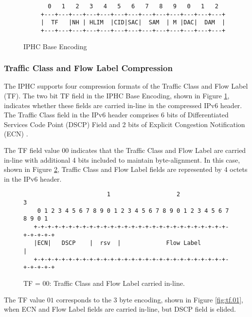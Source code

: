 \documentclass[12pt, titlepage, a4paper]{report}
\newenvironment{mylisting}
{\begin{list}{}{\setlength{\leftmargin}{1em}}\item\footnotesize}
{\end{list}}
\begin{document}
\begin{figure}[htp]
\begin{mylisting}
\begin{verbatim}
       0   1   2   3   4   5   6   7   8   9   0   1   2  
     +---+---+---+---+---+---+---+---+---+---+---+---+---+
     |  TF   |NH | HLIM  |CID|SAC|  SAM  | M |DAC|  DAM  |
     +---+---+---+---+---+---+---+---+---+---+---+---+---+
\end{verbatim}
\end{mylisting}
\caption{IPHC Base Encoding}\label{fig:iphc.format}
\end{figure}

\subsubsection{Traffic Class and  Flow Label Compression}
The IPHC supports four compression formats of the Traffic Class and Flow Label (TF). The two bit TF field in the IPHC Base Encoding, shown in Figure \ref{fig:iphc.format}, indicates whether these fields are carried in-line in the compressed IPv6 header. The Traffic Class field in the IPv6 header comprises 6 bits of Differentiated Services Code Point (DSCP) Field \cite{rfc2474} and 2 bits of Explicit Congestion Notification (ECN) \cite{rfc3168}. 

The TF field value $00$ indicates that the Traffic Class and Flow Label are carried in-line with additional 4 bits included to maintain byte-alignment. In this case, shown in Figure \ref{fig:tf.00}, Traffic Class and  Flow Label fields are represented by 4 octets in the IPv6 header. 
\begin{figure}[htp]
\begin{mylisting}
\begin{verbatim}
                        1                   2                   3
    0 1 2 3 4 5 6 7 8 9 0 1 2 3 4 5 6 7 8 9 0 1 2 3 4 5 6 7 8 9 0 1
   +-+-+-+-+-+-+-+-+-+-+-+-+-+-+-+-+-+-+-+-+-+-+-+-+-+-+-+-+-+-+-+-+
   |ECN|   DSCP    |  rsv  |             Flow Label                |
   +-+-+-+-+-+-+-+-+-+-+-+-+-+-+-+-+-+-+-+-+-+-+-+-+-+-+-+-+-+-+-+-+
\end{verbatim}
\end{mylisting}
\caption{ TF = 00: Traffic Class and Flow Label carried in-line.}\label{fig:tf.00}
\end{figure}

The TF value $01$ corresponds to the 3 byte encoding, shown in Figure \ref{fig:tf.01}, when ECN and Flow Label fields are carried in-line, but DSCP field is elided.
\end{document}
